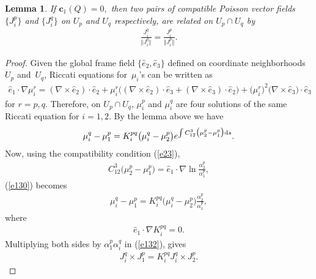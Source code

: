 \documentclass[pdftex]{sigma}
\numberwithin{equation}{section}
\newtheorem{Lemma}[Theorem]{Lemma}
\begin{document}
\begin{Lemma}\label{lemma4}
If $\boldsymbol{c}_{1}(Q) =0,$ then two pairs of compatible Poisson vector
fields $\big\{ J_{i}^{p}\big\} $ and $\big\{ J_{i}^{q}\big\} $ on $U_{p}$ and $U_{q}$ respectively, are related on $U_{p}\cap U_{q}$ by
\begin{gather*}
\frac{J_{i}^{q}}{\big\Vert J_{i}^{q}\big\Vert }=\frac{J_{i}^{p}}{\big\Vert J_{i}^{p}\big\Vert }.
\end{gather*}
\end{Lemma}

\begin{proof}Given the global frame f\/ield $\{ \widehat{e}_{2},\widehat{e}_{3}\} $ def\/ined on coordinate neighbor\-hoods~$U_{p}$ and~$U_{q}$, Riccati equations for~$\mu _{i}$'s can be written as
\begin{gather*}
\widehat{e}_{1}\cdot \nabla \mu _{i}^{r}=( \nabla \times \widehat{e}_{2}) \cdot \widehat{e}_{2}+\mu _{i}^{r}\big(( \nabla \times \widehat{e}_{2}) \cdot \widehat{e}_{3}+( \nabla \times \widehat{e}_{3}) \cdot \widehat{e}_{2}\big) +\big( \mu_{i}^{r}\big)^{2} \big(\nabla \times \widehat{e}_{3} \big) \cdot
\widehat{e}_{3}
\end{gather*}
for $r=p,q$. Therefore, on $U_{p}\cap U_{q}$, $\mu _{i}^{p}$ and $\mu_{i}^{q} $ are four solutions of the same Riccati equation for $i=1,2$. By the lemma above we have
\begin{gather}
\mu _{i}^{q}-\mu _{1}^{p}=K_{i}^{pq}\big( \mu _{i}^{q}-\mu _{2}^{p}\big) e^{\int C_{12}^{3}\big( \mu _{2}^{p}-\mu _{1}^{p}\big) {\rm d}s}. \label{e130}
\end{gather}
Now, using the compatibility condition (\ref{e23}),
\begin{gather*}
C_{12}^{3}\big( \mu _{2}^{p}-\mu _{1}^{p}\big) =\widehat{e}_{1}\cdot\nabla \ln \frac{\alpha _{2}^{p}}{\alpha _{1}^{p}},
\end{gather*}
(\ref{e130}) becomes
\begin{gather}
\mu _{i}^{q}-\mu _{1}^{p}=K_{i}^{pq}\big( \mu _{i}^{q}-\mu _{2}^{p}\big) \frac{\alpha _{2}^{p}}{\alpha _{1}^{p}}, \label{e132}
\end{gather}
where
\begin{gather}
\widehat{e}_{1}\cdot \nabla K_{i}^{pq}=0. \label{e133}
\end{gather}
Multiplying both sides by $\alpha _{1}^{p}\alpha _{i}^{q}$ in (\ref{e132}), gives
\begin{gather}
J_{i}^{q}\times J_{1}^{p}=K_{i}^{pq}J_{i}^{q}\times J_{2}^{p}. \label{e135}
\end{gather}

\end{proof}
\end{document}
